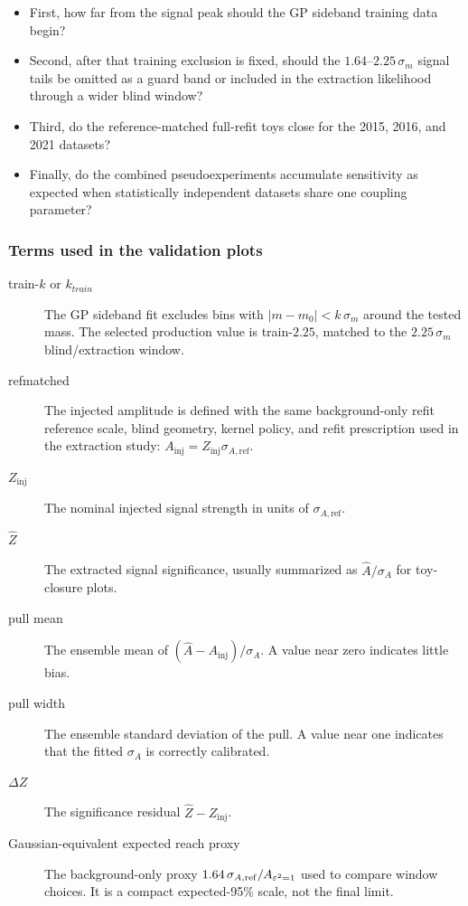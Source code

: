 \begin{itemize}
    \item First, how far from the signal peak should the GP sideband training data begin?

    \item  Second, after that training exclusion is fixed, should the $1.64$--$2.25\,\sigma_m$ signal tails be omitted as a guard band or included in the extraction likelihood through a wider blind window?

    \item Third, do the reference-matched full-refit toys close for the 2015, 2016, and 2021 datasets?

    \item   Finally, do the combined pseudoexperiments accumulate sensitivity as expected when statistically independent datasets share one coupling parameter?

\end{itemize}



\subsubsection*{Terms used in the validation plots}

\begin{description}
\item[train-$k$ or $k_{train}$] The GP sideband fit excludes bins with
$|m-m_0|<k\,\sigma_m$ around the tested mass. The selected production value is
train-$2.25$, matched to the $2.25\,\sigma_m$ blind/extraction window.
\item[refmatched] The injected amplitude is defined with the same
background-only refit reference scale, blind geometry, kernel policy, and refit
prescription used in the extraction study:
$A_{\mathrm{inj}}=Z_{\mathrm{inj}}\sigma_{A,\mathrm{ref}}$.
\item[$Z_{\mathrm{inj}}$] The nominal injected signal strength in units of
$\sigma_{A,\mathrm{ref}}$.
\item[$\hat Z$] The extracted signal significance, usually summarized as
$\hat A/\sigma_A$ for toy-closure plots.
\item[pull mean] The ensemble mean of
$(\hat A-A_{\mathrm{inj}})/\sigma_A$. A value near zero indicates little bias.
\item[pull width] The ensemble standard deviation of the pull. A value near one
indicates that the fitted $\sigma_A$ is correctly calibrated.
\item[$\Delta Z$] The significance residual $\hat Z-Z_{\mathrm{inj}}$.
\item[Gaussian-equivalent expected reach proxy] The background-only proxy
$1.64\,\sigma_{A,\mathrm{ref}}/A_{\varepsilon^2=1}$ used to compare window choices. It is a
compact expected-95\% scale, not the final \CLs{} limit.
\end{description}

